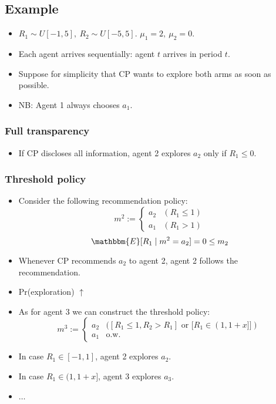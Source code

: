 \documentclass[11pt,a4paper,dvipdfmx]{article}
\newcommand{\1}{\mathbbm{1}}
\newcommand{\E}{\mathbbm{E}}
\begin{document}
\subsection{Example}
\begin{itemize}
	\item $R_1 \sim U[-1,5], \ R_2 \sim U[-5,5]$. $\mu_1 = 2, \ \mu_2 = 0$.
	\item Each agent arrives sequentially: agent $t$ arrives in period $t$.
	\item Suppose for simplicity that CP wants to explore both arms as soon as possible.
	\item NB: Agent 1 always chooses $a_1$.
\end{itemize}

\subsubsection{Full transparency}
\begin{itemize}
	\item If CP discloses all information, agent 2 explores $a_2$ only if $R_1 \leq 0$.
\end{itemize}

\subsubsection{Threshold policy}
\begin{itemize}
	\item Consider the following recommendation policy:
	$$
	m^2 := \begin{cases}
		a_2 & (R_1 \leq 1) \\
		a_1 & (R_1 > 1)
	\end{cases}
	$$
	$$\E[R_1 \mid m^2 = a_2] = 0 \leq m_2$$
	\item Whenever CP recommends $a_2$ to agent 2, agent 2 follows the recommendation.
	\item Pr(exploration) $\uparrow$
	\item As for agent $3$ we can construct the threshold policy:
	$$
	m^3 := \begin{cases}
		a_2 & ([R_1 \leq 1, R_2 > R_1] \text{ or } [R_1 \in (1, 1+x]]) \\
		a_1 & \text{o.w.}
	\end{cases}
	$$
	\item In case $R_1 \in [-1,1]$, agent 2 explores $a_2$.
	\item In case $R_1 \in (1, 1+x]$, agent 3 explores $a_3$.
	\item $\dots$
\end{itemize}
\end{document}
